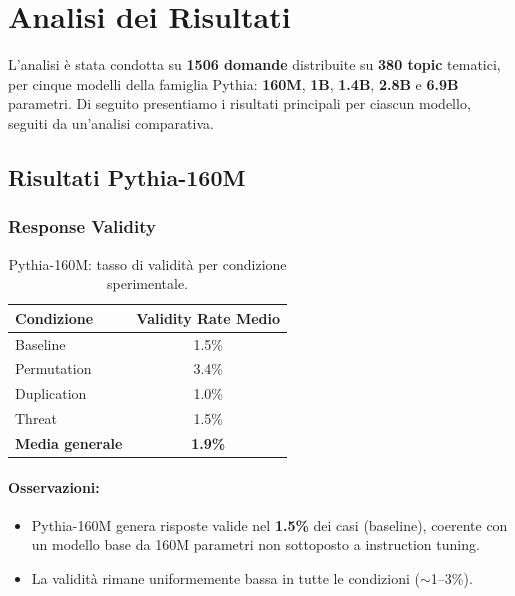 \documentclass[../relazione.tex]{subfiles}
\begin{document}
\section{Analisi dei Risultati}
\label{sec:risultati}

L'analisi è stata condotta su \textbf{1506 domande} distribuite su \textbf{380 topic} tematici, per cinque modelli della famiglia Pythia: \textbf{160M}, \textbf{1B}, \textbf{1.4B}, \textbf{2.8B} e \textbf{6.9B} parametri. Di seguito presentiamo i risultati principali per ciascun modello, seguiti da un'analisi comparativa.

\subsection{Risultati Pythia-160M}

\subsubsection{Response Validity}

\begin{table}[h]
\centering
\begin{tabular}{lc}
\toprule
\textbf{Condizione} & \textbf{Validity Rate Medio} \\
\midrule
Baseline & 1.5\% \\
Permutation & 3.4\% \\
Duplication & 1.0\% \\
Threat & 1.5\% \\
\midrule
\textbf{Media generale} & \textbf{1.9\%} \\
\bottomrule
\end{tabular}
\caption{Pythia-160M: tasso di validità per condizione sperimentale.}
\end{table}

\paragraph{Osservazioni:}
\begin{itemize}
    \item Pythia-160M genera risposte valide nel \textbf{1.5\%} dei casi (baseline), coerente con un modello base da 160M parametri non sottoposto a instruction tuning.
    \item La validità rimane uniformemente bassa in tutte le condizioni ($\sim$1--3\%).
\end{itemize}
\end{document}
